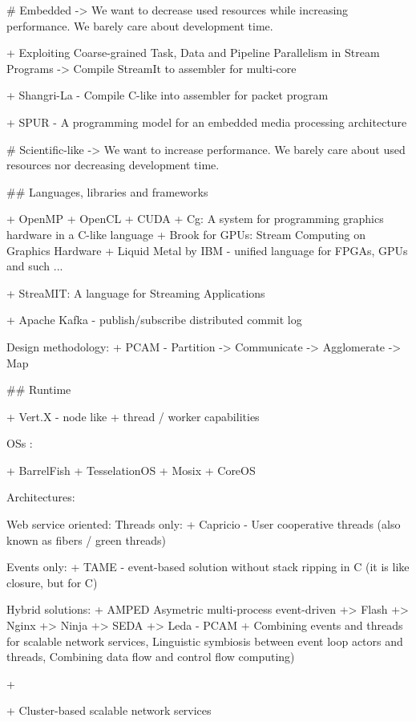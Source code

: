 # Embedded -> We want to decrease used resources while increasing performance. We barely care about development time.



+ Exploiting Coarse-grained Task, Data and Pipeline Parallelism in Stream Programs -> Compile StreamIt to assembler for multi-core

+ Shangri-La - Compile C-like into assembler for packet program

+ SPUR - A programming model for an embedded media processing architecture


# Scientific-like -> We want to increase performance. We barely care about used resources nor decreasing development time.

## Languages, libraries and frameworks

  + OpenMP
  + OpenCL
  + CUDA
  + Cg: A system for programming graphics hardware in a C-like language
  + Brook for GPUs: Stream Computing on Graphics Hardware
  + Liquid Metal by IBM - unified language for FPGAs, GPUs and such ...

  + StreaMIT: A language for Streaming Applications


  + Apache Kafka - publish/subscribe distributed commit log

  Design methodology:
  + PCAM - Partition -> Communicate -> Agglomerate -> Map

## Runtime

  + Vert.X - node like + thread / worker capabilities

  OSs :

  + BarrelFish
  + TesselationOS
  + Mosix
  + CoreOS


  Architectures:


    Web service oriented:
      Threads only:
      + Capricio - User cooperative threads (also known as fibers / green threads)

      Events only:
      + TAME - event-based solution without stack ripping in C (it is like closure, but for C)

      Hybrid solutions:
    + AMPED Asymetric multi-process event-driven
    +> Flash
    +> Nginx
    +> Ninja
    +> SEDA
    +> Leda - PCAM 
    + Combining events and threads for scalable network services, Linguistic symbiosis between event loop actors and threads, Combining data flow and control flow computing)

    + 

    + Cluster-based scalable network services


